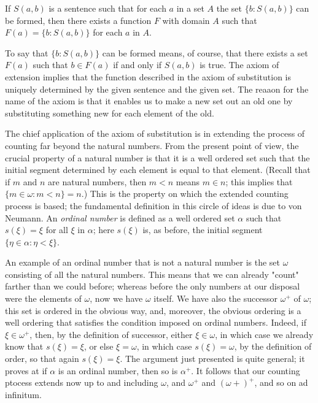 \begin{named} If $S(a,b)$ is a sentence such that for each $a$ in a set $A$ the set $\{ b: S(a, b) \}$ can be formed, then there exists a function $F$ with domain $A$ such that $F(a) = \{ b: S(a,b) \} $ for each $a$ in $A$.
\end{named}

To say that $\{ b: S(a,b) \} $ can be formed means, of course, that there exists a set $F(a)$ such that $b \in F(a)$ if and only if $S(a,b)$ is true. The axiom of extension implies that the function described in the axiom of substitution is uniquely determined by the given sentence and the given set. The reaaon for the name of the axiom is that it enables us to make a new set out an old one by substituting something new for each element of the old. 

The chief application of the axiom of substitution is in extending the process of counting far beyond the natural numbers. From the present point of view, the crucial property of a natural number is that it is a well ordered set such that the initial segment determined by each element is equal to that element. (Recall that if $m$ and $n$ are natural numbers, then $m < n$ means $m \in n$; this implies that $\{ m \in \omega : m <n \} = n$.) This is the property on which the extended counting process is based; the fundamental definition in this circle of ideas is due to von Neumann. An \textit{ordinal number} is defined as a well ordered set $\alpha$ such that $s( \xi ) = \xi$ for all $\xi $ in $\alpha$; here $s( \xi )$ is, as before, the initial segment $\{ \eta \in \alpha: \eta < \xi \} $.

An example of an ordinal number that is not a natural number is the set $\omega$ consisting of all the natural numbers. This means that we can already "count" farther than we could before; whereas before the only numbers at our disposal were the elements of $\omega$, now we have $\omega$ itself. We have also the successor $ \omega^{+}$ of $\omega$; this set is ordered in the obvious way, and, moreover, the obvious ordering is a well ordering that satisfies the condition imposed on ordinal numbers. Indeed, if $\xi \in \omega^{+}$, then, by the definition of successor, either $\xi \in \omega$, in which case we already know that $s( \xi ) = \xi$, or else $ \xi = \omega$, in which case $s( \xi ) =  \omega$, by the definition of order, so that again $s( \xi ) = \xi$. The argument just presented is quite general; it proves at if $\alpha$ is an ordinal number, then so is $\alpha^{+}$. It follows that our counting ptocess extends now up to and including $\omega$, and $\omega^{+}$ and $(\omega{+})^{+}$, and so on ad infinitum.

